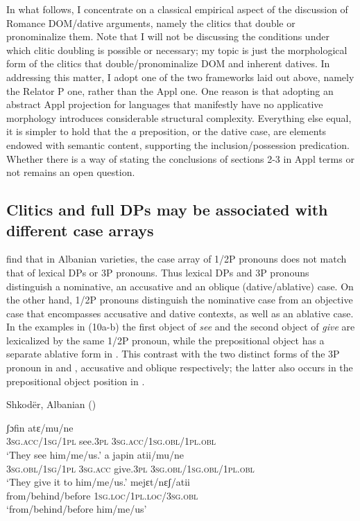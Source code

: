 \documentclass[output=paper]{langscibook}
\begin{document}
In what follows, I concentrate on a classical empirical aspect of the discussion of Romance DOM/dative arguments, namely the clitics that double or pronominalize them. Note that I will not be discussing the conditions under which clitic doubling is possible or necessary; my topic is just the morphological form of the clitics that double/pronominalize DOM and inherent datives. In addressing this matter, I adopt one of the two frameworks laid out above, namely the Relator P one, rather than the Appl one. One reason is that adopting an abstract Appl projection for languages that manifestly have no applicative morphology introduces considerable structural complexity. Everything else equal, it is simpler to hold that the \textit{a} preposition, or the dative case, are elements endowed with semantic content, supporting the inclusion/possession predication. Whether there is a way of stating the conclusions of sections 2-3 in Appl terms or not remains an open question.

\subsection{ Clitics and full DPs may be associated with different case arrays}  %

\citet{ManziniSavoia2014} find that in Albanian varieties, the case array of 1/2P pronouns does not match that of lexical DPs or 3P pronouns. Thus lexical DPs and 3P pronouns distinguish a nominative, an accusative and an oblique (dative/ablative) case. On the other hand, 1/2P pronouns distinguish the nominative case from an objective case that encompasses accusative and dative contexts, as well as an ablative case. In the examples in (10a-b) the first object of \textit{see} and the second object of \textit{give} are lexicalized by the same 1/2P pronoun, while the prepositional object has a separate ablative form in . This contrast with the two distinct forms of the 3P pronoun in  and , accusative and oblique respectively; the latter also occurs in the prepositional object position in .  

\ea\label{ex:manzini:}
Shkodër, Albanian (\citealt{ManziniSavoia2014})\\
\begin{xlist}
\ex {}      {ʃɔfin}    {atɛ/mu/ne}\\
\textsc{3sg.acc/1sg/1pl}    see.\textsc{3pl} \textsc{3sg.acc/1sg.obl/1pl.obl}\\
\glt ‘They see him/me/us.’
\ex {}       {a}   {japin}    {atii/mu/ne}\\
\textsc{3sg.obl/1sg/1pl} \textsc{3sg.acc} give.\textsc{3pl}  \textsc{3sg.obl/1sg.obl/1pl.obl}\\
\glt ‘They give it to him/me/us.’
\ex {}     {mejɛt/nɛʃ/atii}\\
from/behind/before \textsc{1sg.loc/1pl.loc/3sg.obl}\\
\glt ‘from/behind/before him/me/us’
\end{xlist}
\z
\end{document}

